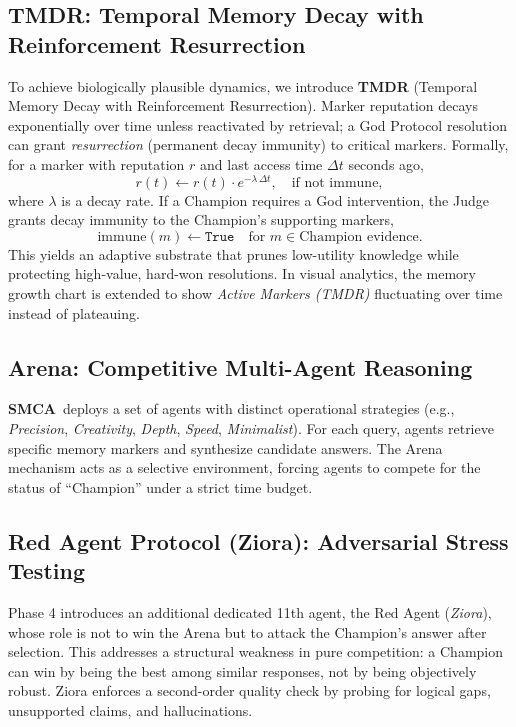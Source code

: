 \documentclass[11pt, a4paper]{article}
\newcommand{\sysname}{\textbf{SMCA}}
\begin{document}
\subsection{TMDR: Temporal Memory Decay with Reinforcement Resurrection}
To achieve biologically plausible dynamics, we introduce \textbf{TMDR} (Temporal Memory Decay with Reinforcement Resurrection). Marker reputation decays exponentially over time unless reactivated by retrieval; a God Protocol resolution can grant \emph{resurrection} (permanent decay immunity) to critical markers. Formally, for a marker with reputation $r$ and last access time $\Delta t$ seconds ago,
\[
r(t) \leftarrow r(t) \cdot e^{-\lambda \,\Delta t},\quad \text{if not immune},
\]
where $\lambda$ is a decay rate. If a Champion requires a God intervention, the Judge grants decay immunity to the Champion's supporting markers,
\[
\mathrm{immune}(m) \gets \texttt{True} \quad \text{for } m \in \text{Champion evidence}.
\]
This yields an adaptive substrate that prunes low-utility knowledge while protecting high-value, hard-won resolutions. In visual analytics, the memory growth chart is extended to show \emph{Active Markers (TMDR)} fluctuating over time instead of plateauing.

\subsection{Arena: Competitive Multi-Agent Reasoning}
\sysname\ deploys a set of agents with distinct operational strategies (e.g., \textit{Precision}, \textit{Creativity}, \textit{Depth}, \textit{Speed}, \textit{Minimalist}). For each query, agents retrieve specific memory markers and synthesize candidate answers. The Arena mechanism acts as a selective environment, forcing agents to compete for the status of ``Champion'' under a strict time budget.

\subsection{Red Agent Protocol (Ziora): Adversarial Stress Testing}
Phase 4 introduces an additional dedicated 11th agent, the Red Agent (\textit{Ziora}), whose role is not to win the Arena but to attack the Champion's answer after selection. This addresses a structural weakness in pure competition: a Champion can win by being the best among similar responses, not by being objectively robust. Ziora enforces a second-order quality check by probing for logical gaps, unsupported claims, and hallucinations.
\end{document}
